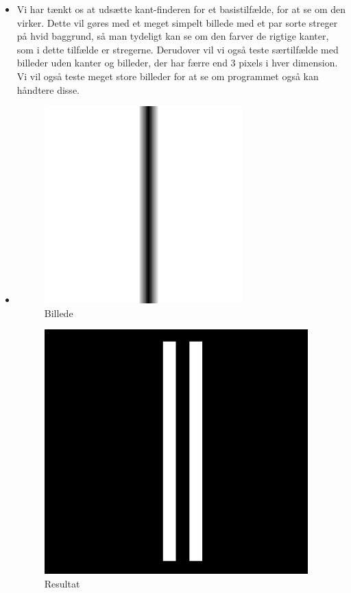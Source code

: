 \documentclass{article}
\begin{document}
\begin{itemize}
	\item Vi har tænkt os at udsætte kant-finderen for et 
	basistilfælde, for at se om den virker. Dette vil gøres
	med et meget simpelt billede med et par sorte streger
	på hvid baggrund, så man tydeligt kan se om den farver
	de rigtige kanter, som i dette tilfælde er stregerne.
	Derudover vil vi også teste særtilfælde med billeder 
	uden kanter og billeder, der har færre end 3 pixels
	i hver dimension. Vi vil også teste meget store 
	billeder for at se om programmet også kan håndtere
	disse.
	\item 
	\begin{figure}
		\centering
		\includegraphics[width=3in]{test1.png}
		\caption{Billede}
		\label{ke1}
	\end{figure}
	\begin{figure}
		\centering
		\includegraphics[width=4in]{test1_result.png}
		\caption{Resultat}
		\label{ke1r}

\end{figure}
\end{itemize}
\end{document}
